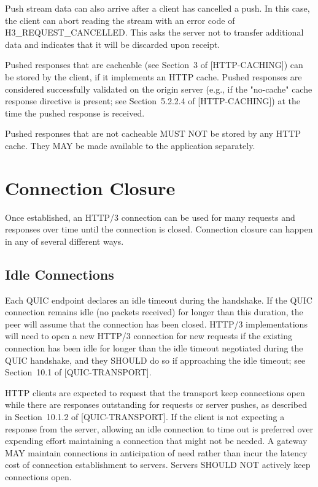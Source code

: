 \documentclass{article}
\begin{document}
\begin{itemize}
Push stream data can also arrive after a client has cancelled a push. In this case, the client can abort reading the stream with an error code of H3\_REQUEST\_CANCELLED.  This asks the server not to transfer additional data and indicates that it will be discarded upon receipt.

Pushed responses that are cacheable (see Section~3 of [HTTP-CACHING]) can be stored by the client, if it implements an HTTP cache.  Pushed responses are considered successfully validated on the origin server (e.g., if the "no-cache" cache response directive is present; see Section~5.2.2.4 of [HTTP-CACHING]) at the time the pushed response is received.

Pushed responses that are not cacheable MUST NOT be stored by any HTTP cache.  They MAY be made available to the application separately.

\end{itemize}
\section{Connection Closure}

Once established, an HTTP/3 connection can be used for many requests and responses over time until the connection is closed.  Connection closure can happen in any of several different ways.

\subsection{Idle Connections}

Each QUIC endpoint declares an idle timeout during the handshake.  If the QUIC connection remains idle (no packets received) for longer than this duration, the peer will assume that the connection has been closed.  HTTP/3 implementations will need to open a new HTTP/3 connection for new requests if the existing connection has been idle for longer than the idle timeout negotiated during the QUIC handshake, and they SHOULD do so if approaching the idle timeout; see Section~10.1 of [QUIC-TRANSPORT].

HTTP clients are expected to request that the transport keep connections open while there are responses outstanding for requests or server pushes, as described in Section~10.1.2 of [QUIC-TRANSPORT]. If the client is not expecting a response from the server, allowing an idle connection to time out is preferred over expending effort maintaining a connection that might not be needed.  A gateway MAY maintain connections in anticipation of need rather than incur the latency cost of connection establishment to servers.  Servers SHOULD NOT actively keep connections open.
\end{document}
